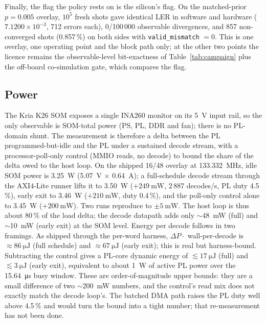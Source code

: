 Finally, the flag the policy rests on is the silicon's flag. On the
matched-prior $p = 0.005$ overlay, $10^{5}$ fresh shots gave identical LER
in software and hardware ($7.1200\times10^{-3}$, 712 errors each), 0/100\,000
observable divergences, and 857 non-converged shots (0.857\,\%) on both
sides with \texttt{valid\_mismatch} $= 0$. This is one overlay, one operating
point and the block path only; at the other two points the licence remains
the observable-level bit-exactness of Table~\ref{tab:campaign} plus the
off-board co-simulation gate, which compares the flag.

\subsection*{Power}

The Kria K26 SOM exposes a single INA260 monitor on its \SI{5}{\volt} input
rail, so the only observable is SOM-total power (PS, PL, DDR and fan); there
is no PL-domain shunt. The measurement is therefore a delta between the PL
programmed-but-idle and the PL under a sustained decode stream, with a
processor-poll-only control (MMIO reads, no decode) to bound the share of the
delta owed to the host loop.
On the shipped 16/48 overlay at \SI{133.332}{\MHz}, idle SOM power is
\SI{3.25}{\watt} (\SI{5.07}{\volt} $\times$ \SI{0.64}{\ampere}); a
full-schedule decode stream through the AXI4-Lite runner lifts it to
\SI{3.50}{\watt} ($+\SI{249}{\milli\watt}$, 2\,887 decodes/s, PL duty
4.5\,\%), early exit to \SI{3.46}{\watt} ($+\SI{210}{\milli\watt}$, duty
0.4\,\%), and the poll-only control alone to \SI{3.45}{\watt}
($+\SI{200}{\milli\watt}$). Two runs reproduce to $\pm\SI{5}{\milli\watt}$.
The host loop is thus about 80\,\% of the load delta; the decode datapath
adds only $\sim$\SI{48}{\milli\watt} (full) and $\sim$\SI{10}{\milli\watt}
(early exit) at the SOM level.
Energy per decode follows in two framings. As shipped through the per-word
harness, $\Delta P \cdot$ wall-per-decode is $\approx\SI{86}{\micro\joule}$
(full schedule) and $\approx\SI{67}{\micro\joule}$ (early exit); this is real
but harness-bound. Subtracting the control gives a PL-core dynamic energy of
$\lesssim\SI{17}{\micro\joule}$ (full) and $\lesssim\SI{3}{\micro\joule}$
(early exit), equivalent to about \SI{1}{\watt} of active PL power over the
\SI{15.64}{\micro\second} busy window. These are order-of-magnitude upper
bounds: they are a small difference of two $\sim$\SI{200}{\milli\watt}
numbers, and the control's read mix does not exactly match the decode
loop's. The batched DMA path raises the PL duty well above 4.5\,\% and would
turn the bound into a tight number; that re-measurement has not been done.

